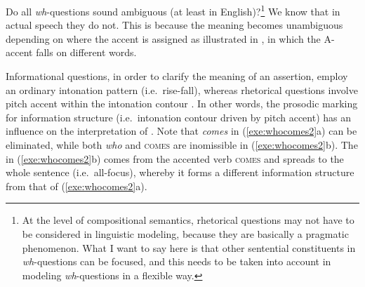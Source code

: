 

Do all \textit{wh}-questions sound ambiguous (at least in
English)?\footnote{At the level of compositional semantics, rhetorical
  questions may not have to be considered in linguistic modeling,
  because they are basically a pragmatic phenomenon. What I want to
  say here is that other sentential constituents in
  \textit{wh}-questions can be focused, and this needs to be taken
  into account in modeling \textit{wh}-questions in a flexible
  way.} We know that in actual speech they
do not. This is because the meaning becomes unambiguous depending on
where the accent is assigned as illustrated in ,
in which the A-accent falls on different words.




\noindent Informational questions, in order to clarify the meaning of
an assertion, employ an ordinary intonation pattern (i.e.\ rise-fall),
whereas rhetorical questions involve pitch accent within the
intonation contour \citep{gunlogson:01}. In other words, the prosodic
marking for information structure (i.e.\ intonation contour driven by
pitch accent) has an influence on the interpretation of
. Note that \textit{comes} in
(\ref{exe:whocomes2}a) can be eliminated, while both \textit{who} and
\textsc{comes} are inomissible in (\ref{exe:whocomes2}b). The  in
(\ref{exe:whocomes2}b) comes from the accented verb \textsc{comes} and
spreads to the whole sentence (i.e.\ all-focus), whereby it forms a
different information structure from that of (\ref{exe:whocomes2}a).


